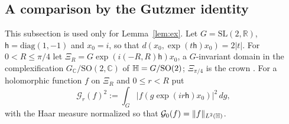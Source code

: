 \subsection{A comparison by the Gutzmer identity}\label{subsec:gutzmer}
This subsection is used only for Lemma~\ref{lem:ex}. Let $G=\mathrm{SL}(2,\mathbb R)$, $\mathsf h=\mathrm{diag}(1,-1)$ and $x_0=i$, so that
$d(x_0,\exp(t\mathsf h)x_0)=2|t|$. For $0<R\le\pi/4$ let $\Xi_R=G\exp(i(-R,R)\mathsf h)x_0$, a $G$-invariant domain in the complexification
$G_{\mathbb C}/\mathrm{SO}(2,\mathbb C)$ of $\mathbb{H}=G/\mathrm{SO}(2)$; $\Xi_{\pi/4}$ is the crown \cite[\S7.2]{K}. For a holomorphic function $f$ on $\Xi_R$ and $0\le r<R$ put
\[
\mathcal G_r(f)^2:=\int_G|f(g\exp(ir\mathsf h)x_0)|^2\,dg ,
\]
with the Haar measure normalized so that $\mathcal G_0(f)=\lVert f\rVert_{L^2(\mathbb{H})}$.

